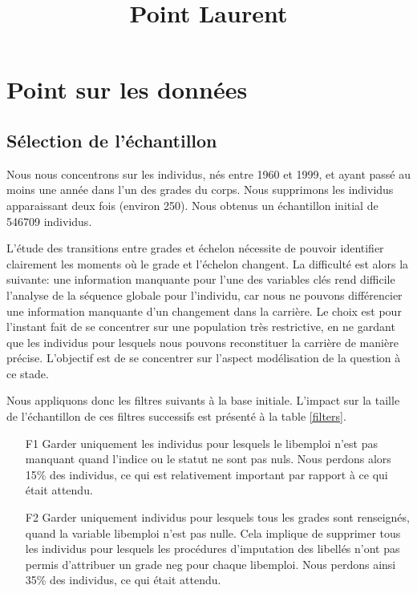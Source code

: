 \documentclass[11pt,a4paper]{article}
\begin{document}
\title{Point Laurent}


\maketitle


\section{Point sur les données}


\subsection{Sélection de l'échantillon}

Nous nous concentrons sur les individus, nés entre 1960 et 1999, et ayant passé au moins une année dans l'un des grades du corps. Nous supprimons les individus apparaissant deux fois (environ 250). Nous obtenus un échantillon initial de 546709 individus. 

L'étude des transitions entre grades et échelon nécessite de pouvoir identifier clairement les moments où le grade et l'échelon changent. La difficulté est alors la suivante: une information manquante pour l'une des variables clés rend difficile l'analyse de la séquence globale pour l'individu, car nous ne pouvons différencier une information manquante d'un changement dans la carrière. Le choix est pour l'instant fait de se concentrer sur une population très restrictive, en ne gardant que les individus pour lesquels nous pouvons reconstituer la carrière de manière précise. L'objectif est de se concentrer sur l'aspect modélisation de la question à ce stade. 

Nous appliquons donc les filtres suivants à la base initiale. L'impact sur la taille de l'échantillon de ces filtres successifs est présenté à la table \ref{filters}. 
\begin{enumerate}[leftmargin=1cm ,parsep=0cm,itemsep=0cm,topsep=0cm] 
\item[F1] Garder uniquement les individus pour lesquels le libemploi n'est pas manquant quand l'indice ou le statut ne sont pas nuls. Nous perdons alors 15\% des individus, ce qui est relativement important par rapport à ce qui était attendu. 
\item[F2] Garder uniquement individus pour lesquels tous les grades sont renseignés, quand la variable libemploi n'est pas nulle. Cela implique de supprimer tous les individus pour lesquels les procédures d'imputation des libellés n'ont pas permis d'attribuer un grade neg pour chaque libemploi. Nous perdons ainsi 35\% des individus, ce qui était attendu. 
\end{enumerate}
\end{document}
